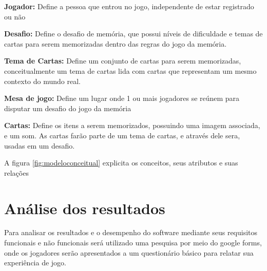 \begin{alineascomponto}
  \item \textbf{Jogador:} Define a pessoa que entrou no jogo, independente de estar registrado ou não
  \item \textbf{Desafio:} Define o desafio de memória, que possui níveis de dificuldade e temas de cartas para serem memorizadas dentro das regras do jogo da memória.  
  \item \textbf{Tema de Cartas:} Define um conjunto de cartas para serem memorizadas, conceitualmente um tema de cartas lida com cartas que representam um mesmo contexto do mundo real.
  \item \textbf{Mesa de jogo:} Define um lugar onde 1 ou mais jogadores se reúnem para disputar um desafio do jogo da memória 
  \item \textbf{Cartas:}  Define os itens a serem memorizados, possuindo uma imagem associada, e um som. As cartas farão parte de um tema de cartas, e através dele sera, usadas em um desafio. 
\end{alineascomponto}


A figura \ref{fig:modeloconceitual} explicita os conceitos, seus atributos e suas relações

\begin{figure}[h!]
  \centering
\end{figure}

\section{Análise dos resultados}

Para analisar os resultados e o desempenho do software mediante seus requisitos funcionais e não funcionais será utilizado uma pesquisa por meio do google forms, onde os jogadores serão apresentados a um questionário básico para relatar sua experiência de jogo.

